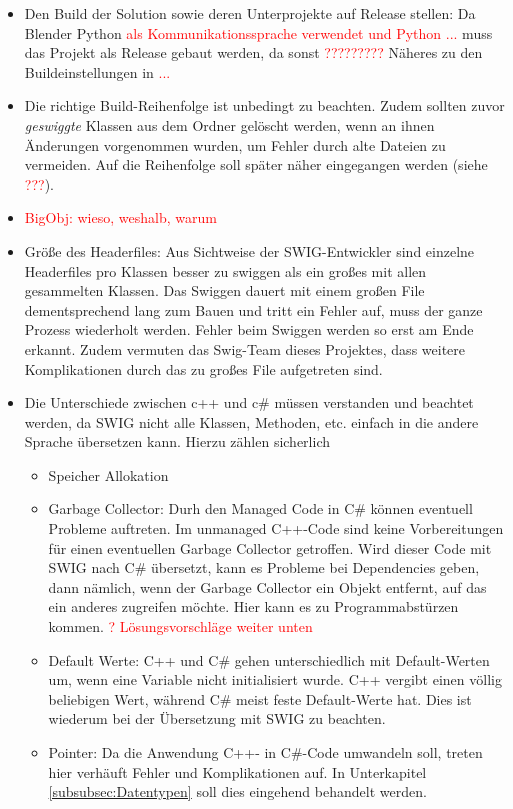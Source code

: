 \begin{itemize}
\item Den Build der Solution sowie deren Unterprojekte auf Release stellen: Da Blender Python \textcolor{red}{als Kommunikationssprache verwendet und Python ...} muss das Projekt als Release gebaut werden, da sonst \textcolor{red}{?????????} Näheres zu den Buildeinstellungen in \textcolor{red}{...}
\item Die richtige Build-Reihenfolge ist unbedingt zu beachten. Zudem sollten zuvor \emph{geswiggte} Klassen aus dem Ordner gelöscht werden, wenn an ihnen Änderungen vorgenommen wurden, um Fehler durch alte Dateien zu vermeiden. Auf die Reihenfolge soll später näher eingegangen werden (siehe \textcolor{red}{???}).
\item \textcolor{red}{BigObj: wieso, weshalb, warum}
\item Größe des Headerfiles: Aus Sichtweise der SWIG-Entwickler sind einzelne Headerfiles pro Klassen besser zu swiggen als ein großes mit allen gesammelten Klassen. Das Swiggen dauert mit einem großen File dementsprechend lang zum Bauen und tritt ein Fehler auf, muss der ganze Prozess wiederholt werden. Fehler beim Swiggen werden so erst am Ende erkannt. Zudem vermuten das Swig-Team dieses Projektes, dass weitere Komplikationen durch das zu großes File aufgetreten sind. 
\item Die Unterschiede zwischen c++ und c\# müssen verstanden und beachtet werden, da SWIG nicht alle Klassen, Methoden, etc. einfach in die andere Sprache übersetzen kann. Hierzu zählen sicherlich 
	\begin{itemize}
	\item Speicher Allokation
	\item Garbage Collector: Durh den Managed Code in C\# können eventuell Probleme auftreten. Im unmanaged C++-Code sind keine Vorbereitungen für einen eventuellen Garbage Collector getroffen. Wird dieser Code mit SWIG nach C\# übersetzt, kann es Probleme bei Dependencies geben, dann nämlich, wenn der Garbage Collector ein Objekt entfernt, auf das ein anderes zugreifen möchte. Hier kann es zu Programmabstürzen kommen. \textcolor{red}{? Lösungsvorschläge weiter unten}
	\item Default Werte: C++ und C\# gehen unterschiedlich mit Default-Werten um, wenn eine Variable nicht initialisiert wurde. C++ vergibt einen völlig beliebigen Wert, während C\# meist feste Default-Werte hat. Dies ist wiederum bei der Übersetzung mit SWIG zu beachten. 
	\item Pointer: Da die Anwendung C++- in C\#-Code umwandeln soll, treten hier verhäuft Fehler und Komplikationen auf. In Unterkapitel \ref{subsubsec:Datentypen} soll dies eingehend behandelt werden. 

\end{itemize}
\end{itemize}
